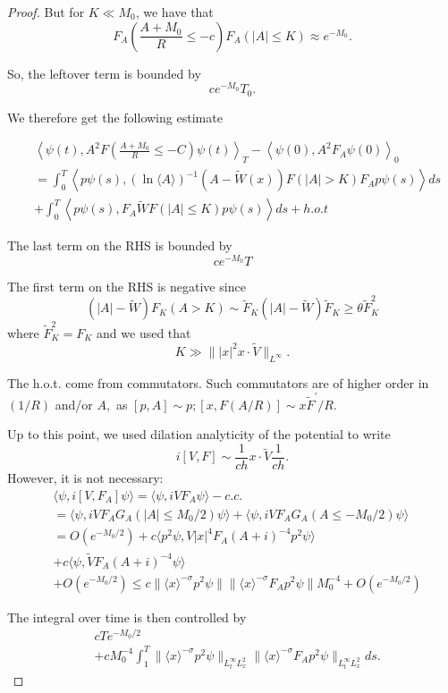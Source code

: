 \documentclass[11pt]{article}
\begin{document}
\begin{proof}
But for $K \ll M_{0}$, we have that
$$
F_{A}\left(\frac{A+M_{0}}{R} \leq-c\right) F_{A}(|A| \leq K) \approx e^{-M_{0}} .
$$



So, the leftover term is bounded by
$$
c e^{-M_{0}} T_{0}.
$$

We therefore get the following estimate

\begin{align}\label{income}
& \left\langle\psi(t), {A}^{2} F\left(\frac{A+M_{0}}{R} \leq-C\right) \psi(t)\right\rangle_{T}-\left\langle\psi(0), A^{2} F_{A} \psi(0)\right\rangle_{0} \\
& =\int_{0}^{T}\left\langle p \psi(s),(\ln \langle A\rangle)^{-1}(A-\tilde{W}(x)) F(|A|>K) F_{A} p \psi(s)\right\rangle d s \\
& +\int_{0}^{T}\left\langle p \psi(s), F_{A} \tilde{W} F(|A| \leq K) p \psi(s)\right\rangle d s+h .o. t
\end{align}


The last term on the RHS is bounded by
$$
c e^{-M_{0}} T
$$

The first term on the RHS is negative since
$$
(|A|-\tilde{W}) F_{K}(A>K) \sim \tilde{F}_{K}(|A|-\tilde{W}) \tilde{F}_{K} \geqslant \theta \tilde{F}_{K}^{2}
$$
where $\tilde{F}_{K}^{2}=F_{K}$ and we used that
$$
K \gg \||x|^{2} x \cdot \tilde{V} \|_{L^{\infty}}.
$$

The h.o.t. come from commutators. Such commutators are of higher order in $(1 / R)$ and/or $A,$ as
$[p, A] \sim p ;[x, F(A / R)] \sim x \tilde{F}^{\prime} / R$.


Up to this point, we used dilation analyticity of the potential to write 
$$
i[V,F]\sim \frac{1}{ch} x\cdot\tilde {V}\frac{1}{ch}.
$$
However, it is not necessary:
\begin{align}
&\langle \psi, i[V,F_A]\psi\rangle=\langle \psi, iVF_A\psi\rangle -c.c.\\
&=\langle \psi, iVF_AG_A(|A|\leq M_0/2)\psi\rangle+\langle \psi, iVF_AG_A(A\leq -M_0/2)\psi\rangle\\
&=O(e^{-M_0/2})+c\langle p^2\psi, V|x|^4 F_A(A+i)^{-4}p^2\psi\rangle\\
&+c\langle \psi, \tilde{V} F_A(A+i)^{-4}\psi\rangle\\
&+O(e^{-M_0/2})\leq c\|\langle x\rangle^{-\sigma}p^2\psi\| \|\langle x\rangle^{-\sigma} F_A p^2\psi\|M_0^{-4} +O(e^{-M_0/2})
\end{align}

The integral over time is then controlled by
\begin{align}
&cTe^{-M_0/2}\\
&+cM_0^{-4}\int_1^T\| \langle x\rangle^{-\sigma}p^2\psi\|_{L_t^{\infty}L^2_x} \| \langle x\rangle^{-\sigma}F_Ap^2\psi\|_{L_t^{\infty}L^2_x} ds.
\end{align}


\end{proof}
\end{document}
